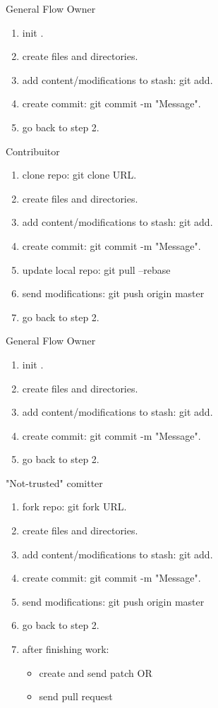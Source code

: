 \documentclass{workshop}
\begin{document}
\begin{frame}{General Flow}
Owner\\
\begin{enumerate}
\item init .
\item create files and directories.
\item add content/modifications to stash: git add.
\item create commit: git commit -m "Message".
\item go back to step 2.
\end{enumerate}
Contribuitor\\
\begin{enumerate}
\item clone repo: git clone URL.
\item create files and directories.
\item add content/modifications to stash: git add.
\item create commit: git commit -m "Message".
\item update local repo: git pull --rebase
\item send modifications: git push origin master
\item go back to step 2.
\end{enumerate}
\end{frame}

\begin{frame}{General Flow}
Owner\\
\begin{enumerate}
\item init .
\item create files and directories.
\item add content/modifications to stash: git add.
\item create commit: git commit -m "Message".
\item go back to step 2.
\end{enumerate}
"Not-trusted" comitter\\
\begin{enumerate}
\item fork repo: git fork URL.
\item create files and directories.
\item add content/modifications to stash: git add.
\item create commit: git commit -m "Message".
\item send modifications: git push origin master
\item go back to step 2.
\item after finishing work:
\begin{itemize}
\item create and send patch OR
\item send pull request
\end{itemize}
\end{enumerate}
\end{frame}
\end{document}
